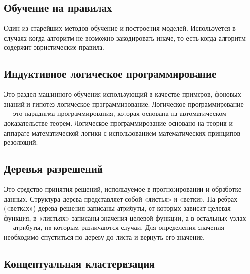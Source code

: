 \documentclass{standalone}
\begin{document}
\subsection{Обучение на правилах} %

\par Один из старейших методов обучение и построения моделей. Используется в случаях когда алгоритм не возможно закодировать иначе, то есть когда алгоритм содержит эвристические правила.

\subsection{Индуктивное логическое программирование} %

\par Это раздел машинного обучения использующий в качестве примеров, фоновых знаний и гипотез логическое программирование. Логическое программирование — это парадигма программирования, которая основана на автоматическом доказательстве теорем. Логическое программирование основано на теории и аппарате математической логики с использованием математических принципов резолюций.

\subsection{Деревья разрешений} %

\par Это средство принятия решений, используемое в прогнозировании и обработке данных. Структура дерева представляет собой «листья» и «ветки». На ребрах («ветках») дерева решения записаны атрибуты, от которых зависит целевая функция, в «листьях» записаны значения целевой функции, а в остальных узлах — атрибуты, по которым различаются случаи. Для определения значения, необходимо спуститься по дереву до листа и вернуть его значение.

\subsection{Концептуальная кластеризация} %
\end{document}

